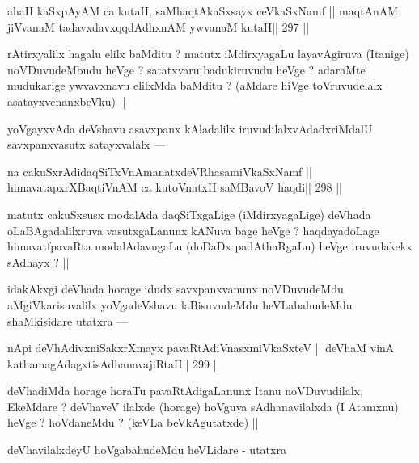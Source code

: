 \begin{shl}
ahaH kaSxpAyAM ca kutaH, saMhaqtAkaSxsayx ceVkaSxNamf ||
maqtAnAM jiVvanaM tadavxdavxqqdAdhxnAM ywvanaM kutaH\hfill || 297 ||
\end{shl}

\begin{artha}
rAtirxyalilx hagalu elilx baMditu ? matutx iMdirxyagaLu layavAgiruva (Itanige) noVDuvudeMbudu heVge ? satatxvaru badukiruvudu heVge ? adaraMte mudukarige ywvavxnavu elilxMda baMditu ? (aMdare hiVge toVruvudelalx asatayxvenanxbeVku) ||
\end{artha}

\begin{artha}
yoVgayxvAda deVshavu asavxpanx kAladalilx iruvudilalxvAdadxriMdalU savxpanxvasutx satayxvalalx ---
\end{artha}

\begin{shl}
na cakuSxrAdidaqSiTxVnAmanatxdeVRhasamiVkaSxNamf ||
himavatapxrXBaqtiVnAM ca kutoV\s natxH saMBavoV haqdi\hfill || 298 ||
\end{shl}

\begin{artha}
matutx cakuSxsusx modalAda daqSiTxgaLige (iMdirxyagaLige) deVhada oLaBAgadalilxruva vasutxgaLanunx kANuva bage heVge ? haqdayadoLage himavatfpavaRta modalAdavugaLu (doDaDx padAthaRgaLu) heVge iruvudakekx sAdhayx ? || 
\end{artha}

\begin{artha}
idakAkxgi deVhada horage idudx savxpanxvanunx noVDuvudeMdu aMgiVkarisuvalilx yoVgadeVshavu laBisuvudeMdu heVLabahudeMdu shaMkisidare utatxra ---
\end{artha}

\begin{shl}
nApi deVhAdivxniSakxrXmayx pavaRtAdiVnasxmiVkaSxteV ||
deVhaM vinA kathamagAdagxtisAdhanavajiRtaH\hfill || 299 ||
\end{shl}

\begin{artha}
deVhadiMda horage horaTu pavaRtAdigaLanunx Itanu noVDuvudilalx, EkeMdare ? deVhaveV ilalxde (horage) hoVguva sAdhanavilalxda (I Atamxnu) heVge ? hoVdaneMdu ? (keVLa beVkAgutatxde) ||
\end{artha}

\begin{artha}
deVhavilalxdeyU hoVgabahudeMdu heVLidare - utatxra
\end{artha}

